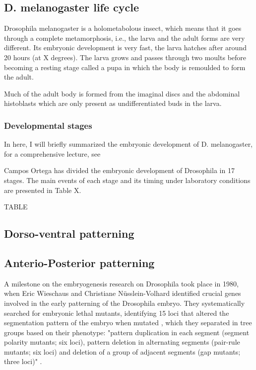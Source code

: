 \subsection{D. melanogaster life cycle}

Drosophila melanogaster is a holometabolous insect, which means that it goes through a complete metamorphosis, i.e., the larva and the adult forms are very different.
Its embryonic development is very fast, the larva hatches after around 20 hours (at  X degrees).
The larva grows and passes through two moults before becoming a resting stage called a pupa in which
the body is remoulded to form the adult. 

Much of the adult body is formed
from the imaginal discs and the abdominal histoblasts which are only present
as undifferentiated buds in the larva.

\subsubsection{Developmental stages}

In here, I will briefly summarized the embryonic development of D. melanogaster, for a comprehensive lecture, see \citep{Campos-Ortega1985,Gilbert2014}

Campos Ortega has divided the embryonic development of Drosophila in 17 stages. The main events of each stage and its timing under laboratory conditions are presented in Table X.

TABLE


\subsection{Dorso-ventral patterning}

\subsection{Anterio-Posterior patterning}

A milestone on the embryogenesis research on Drosophila took place in 1980, when Eric Wieschaus and Christiane N\"{u}sslein-Volhard identified crucial genes involved in the early patterning of the Drosophila embryo.
They systematically searched for embryonic lethal mutants, identifying 15 loci that altered the segmentation pattern of the embryo when mutated \citep{Nusslein-Volhard1980}, which they separated in tree groups based on their phenotype: "pattern duplication in each
segment (segment polarity mutants; six loci), pattern deletion in
alternating segments (pair-rule mutants; six loci) and deletion of
a group of adjacent segments (gap mutants; three loci)" \citep{Nusslein-Volhard1980}.

